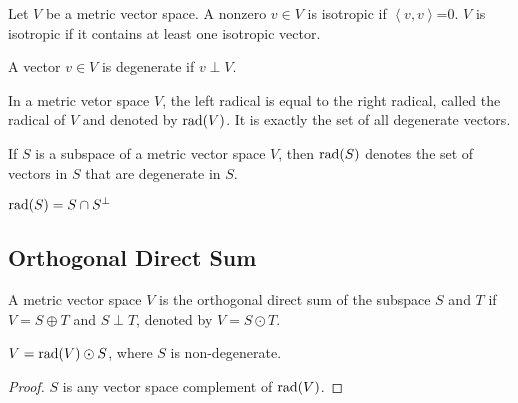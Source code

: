 \begin{definition}[isotropic]
Let $V$ be a metric vector space. A nonzero $v\in V$ is isotropic if $\left\langle v,v \right\rangle$=0. $V$ is isotropic if it contains at least one isotropic vector. 
\end{definition}
\begin{definition}[degenerate]
A vector $v\in V$ is degenerate if $v\perp V$.
\end{definition}
\begin{remark}
In a metric vetor space $V$, the left radical is equal to the right radical, called the radical of $V$ and denoted by $\operatorname{rad}(V)$. It is exactly the set of all degenerate vectors.
\end{remark}
\begin{definition}
If $S$ is a subspace of a metric vector space $V$, then $\operatorname{rad}(S)$ denotes the set of vectors in $S$ that are degenerate in $S$.
\end{definition}
\begin{remark}
$\operatorname{rad}(S)=S\cap S^\perp$
\end{remark}
\subsection{Orthogonal Direct Sum}
\begin{definition}
A metric vector space $V$ is the orthogonal direct sum of the subspace $S$ and $T$ if $V=S\oplus T$ and $S\perp T$, denoted by $V=S\odot T$.
\end{definition}

\begin{theorem}
$V=\operatorname{rad}(V)\odot S$, where $S$ is non-degenerate.
\end{theorem}
\begin{proof}
$S$ is any vector space complement of $\operatorname{rad}(V)$.
\end{proof}

